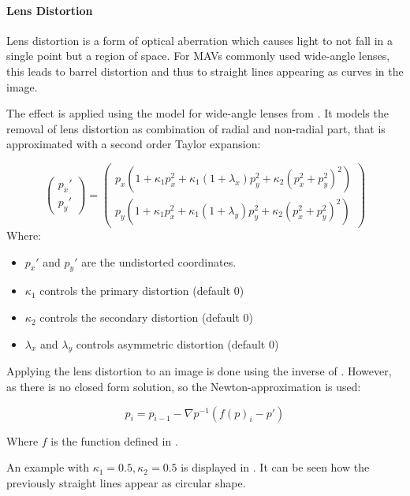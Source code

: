 \paragraph{Lens Distortion}

Lens distortion is a form of optical aberration which causes light to not fall in a single point but a region of space. For \acp{MAV} commonly used wide-angle lenses, this leads to barrel distortion and thus to straight lines appearing as curves in the image.

The effect is applied using the model for wide-angle lenses from \cite{Vass}. It models the removal of lens distortion as combination of radial and non-radial part, that is approximated with a second order Taylor expansion:

\begin{equation}
\begin{pmatrix}
	p_x' \\
	p_y'
\end{pmatrix} = \begin{pmatrix}
p_x(1 + \kappa_1 p_x^2 + \kappa_1 (1 + \lambda _x)p_y^2 + \kappa_2(p_x^2 + p_y^2)^2) \\
p_y(1 + \kappa_1 p_x^2 + \kappa_1 (1 + \lambda _y)p_y^2 + \kappa_2(p_x^2 + p_y^2)^2)
\end{pmatrix} 
\label{eq:distortion}
\end{equation}
Where:
\begin{itemize}
	\item $p_x'$ and $p_y'$ are the undistorted coordinates.
	\item $\kappa_1$ controls the primary distortion (default 0)
	\item $\kappa_2$ controls the secondary distortion (default 0)
	\item $\lambda_x$ and $\lambda_y$ controls asymmetric distortion (default 0)
\end{itemize}
 
Applying the lens distortion to an image is done using the inverse of . However, as there is no closed form solution, so the Newton-approximation is used:

\begin{equation}
	p_i = p_{i-1} - \nabla p^{-1} (f(p)_i-p')
\end{equation}

Where $f$ is the function defined in . 

An example with $\kappa_1 = 0.5, \kappa_2 = 0.5$ is displayed in . It can be seen how the previously straight lines appear as circular shape.

